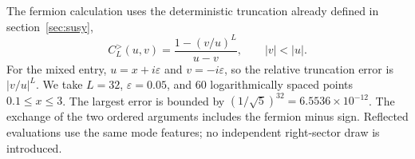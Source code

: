 The fermion calculation uses the deterministic truncation already defined
in section~\ref{sec:susy},
\begin{equation}
C_L^>(u,v)=\frac{1-(v/u)^L}{u-v},\qquad |v|<|u|.
\end{equation}
For the mixed entry, $u=x+i\varepsilon$ and $v=-i\varepsilon$, so
the relative truncation error is $|v/u|^L$.  We take $L=32$,
$\varepsilon=0.05$, and 60 logarithmically spaced points
$0.1\le x\le3$.  The largest error is bounded by
$(1/\sqrt5)^{32}=6.5536\times10^{-12}$.
The exchange of the two ordered arguments includes the fermion minus
sign.  Reflected evaluations use the same mode features; no independent
right-sector draw is introduced.
